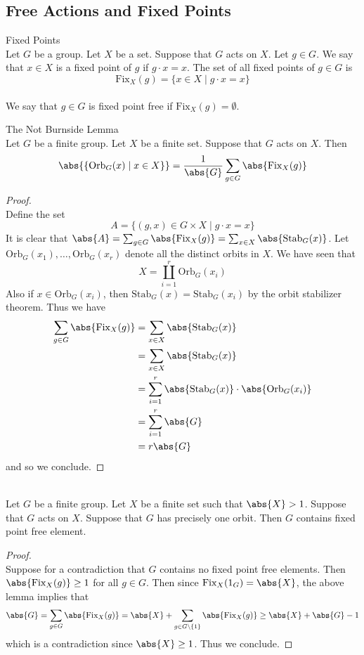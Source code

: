 \documentclass[a4paper]{article}
\begin{document}
\subsection{Free Actions and Fixed Points}
\begin{defn}{Fixed Points}{}\\
Let $G$ be a group. Let $X$ be a set. Suppose that $G$ acts on $X$. Let $g\in G$. We say that $x\in X$ is a fixed point of $g$ if $g\cdot x=x$. The set of all fixed points of $g\in G$ is $$\text{Fix}_X(g)=\{x\in X\;|\;g\cdot x=x\}$$~\\
We say that $g\in G$ is fixed point free if $\text{Fix}_X(g)=\emptyset$. 
\end{defn}

\begin{lmm}{The Not Burnside Lemma}{}\\
Let $G$ be a finite group. Let $X$ be a finite set. Suppose that $G$ acts on $X$. Then $$\abs{\{\text{Orb}_G(x)\;|\;x\in X\}}=\frac{1}{\abs{G}}\sum_{g\in G}\abs{\text{Fix}_X(g)}$$ 
\begin{proof}\\
Define the set $$A=\{(g,x)\in G\times X\;|\;g\cdot x=x\}$$ It is clear that $\abs{A}=\sum_{g\in G}\abs{\text{Fix}_X(g)}=\sum_{x\in X}\abs{\text{Stab}_G(x)}$. Let $\text{Orb}_G(x_1),\dots,\text{Orb}_G(x_r)$ denote all the distinct orbits in $X$. We have seen that $$X=\coprod_{i=1}^r\text{Orb}_G(x_i)$$ Also if $x\in\text{Orb}_G(x_i)$, then $\text{Stab}_G(x)=\text{Stab}_G(x_i)$ by the orbit stabilizer theorem. Thus we have 
\begin{align*}
\sum_{g\in G}\abs{\text{Fix}_X(g)}&=\sum_{x\in X}\abs{\text{Stab}_G(x)}\\
&=\sum_{x\in X}\abs{\text{Stab}_G(x)}\\
&=\sum_{i=1}^r\abs{\text{Stab}_G(x)}\cdot\abs{\text{Orb}_G(x_i)}\\
&=\sum_{i=1}^r\abs{G}\\
&=r\abs{G}
\end{align*}
and so we conclude. 
\end{proof}
\end{lmm}

\begin{crl}{}{}\\
Let $G$ be a finite group. Let $X$ be a finite set such that $\abs{X}>1$. Suppose that $G$ acts on $X$. Suppose that $G$ has precisely one orbit. Then $G$ contains fixed point free element. 
\begin{proof}\\
Suppose for a contradiction that $G$ contains no fixed point free elements. Then $\abs{\text{Fix}_X(g)}\geq 1$ for all $g\in G$. Then since $\text{Fix}_X(1_G)=\abs{X}$, the above lemma implies that $$\abs{G}=\sum_{g\in G}\abs{\text{Fix}_X(g)}=\abs{X}+\sum_{g\in G\setminus\{1\}}\abs{\text{Fix}_X(g)}\geq\abs{X}+\abs{G}-1$$ which is a contradiction since $\abs{X}\geq 1$. Thus we conclude. 
\end{proof}
\end{crl}
\end{document}
